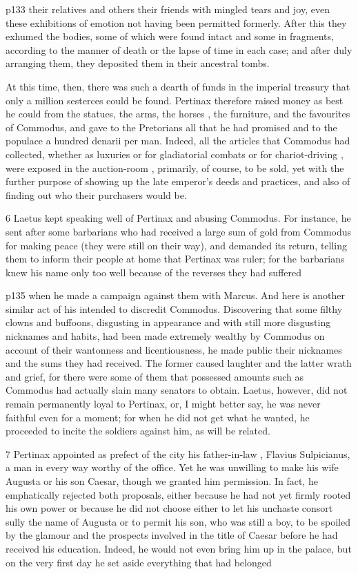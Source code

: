 p133 their relatives and others their friends with mingled tears and joy, even these exhibitions of emotion not having been permitted formerly. After this they exhumed the bodies, some of which were found intact and some in fragments, according to the manner of death or the lapse of time in each case; and after duly arranging them, they deposited them in their ancestral tombs.

At this time, then, there was such a dearth of funds in the imperial treasury that only a million sesterces could be found. Pertinax therefore raised money as best he could from the statues, the arms, the horses , the furniture, and the favourites of Commodus, and gave to the Pretorians all that he had promised and to the populace a hundred denarii per man. Indeed, all the articles that Commodus had collected, whether as luxuries or for gladiatorial combats or for chariot-driving , were exposed in the auction-room , primarily, of course, to be sold, yet with the further purpose of showing up the late emperor's deeds and practices, and also of finding out who their purchasers would be.

6
Laetus kept speaking well of Pertinax and abusing Commodus. For instance, he sent after some barbarians who had received a large sum of gold from Commodus for making peace (they were still on their way), and demanded its return, telling them to inform their people at home that Pertinax was ruler; for the barbarians knew his name only too well because of the reverses they had suffered

p135 when he made a campaign against them with Marcus. And here is another similar act of his intended to discredit Commodus. Discovering that some filthy clowns and buffoons, disgusting in appearance and with still more disgusting nicknames and habits, had been made extremely wealthy by Commodus on account of their wantonness and licentiousness, he made public their nicknames and the sums they had received. The former caused laughter and the latter wrath and grief, for there were some of them that possessed amounts such as Commodus had actually slain many senators to obtain. Laetus, however, did not remain permanently loyal to Pertinax, or, I might better say, he was never faithful even for a moment; for when he did not get what he wanted, he proceeded to incite the soldiers against him, as will be related.

7
Pertinax appointed as prefect of the city his father-in\texthebrew{‑}law , Flavius Sulpicianus, a man in every way worthy of the office. Yet he was unwilling to make his wife Augusta or his son Caesar, though we granted him permission. In fact, he emphatically rejected both proposals, either because he had not yet firmly rooted his own power or because he did not choose either to let his unchaste consort sully the name of Augusta or to permit his son, who was still a boy, to be spoiled by the glamour and the prospects involved in the title of Caesar before he had received his education. Indeed, he would not even bring him up in the palace, but on the very first day he set aside everything that had belonged

